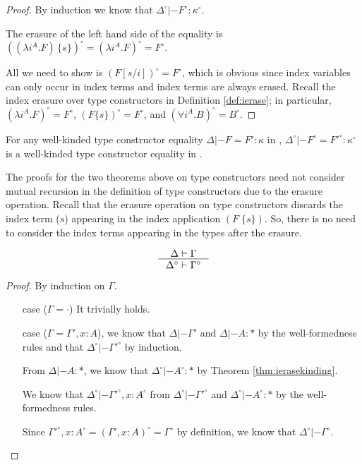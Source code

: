 \begin{proof}
By induction we know that $\Delta^\circ |- F^\circ : \kappa^\circ$.

The erasure of the left hand side of the equality is\\
$((\lambda i^A.F)\,\{s\})^\circ = (\lambda i^A.F)^\circ = F^\circ$.

All we need to show is $(F[s/i])^\circ = F^\circ$, which is obvious
since index variables can only occur in index terms and index terms
are always erased. Recall the index erasure over type constructors in
Definition \ref{def:ierase}; in particular, $(\lambda i^A.F)^\circ=F^\circ$,
$(F\{s\})^\circ=F^\circ$, and $(\forall i^A.B)^\circ=B^\circ$.
\end{proof}
\begin{remark}
For any well-kinded type constructor equality $\Delta |- F=F':\kappa$ in \Fi,
$\Delta^\circ|- F^\circ=F'^\circ:\kappa^\circ$ is
a well-kinded type constructor equality in \Fw.
\end{remark}

The proofs for the two theorems above on type constructors need not consider
mutual recursion in the definition of type constructors due to
the erasure operation. Recall that the erasure operation on type constructors
discards the index term ($s$) appearing in the index application $(F\;\{s\})$.
So, there is no need to consider the index terms appearing in the types after
the erasure.

\begin{theorem}
\label{thm:ierasetmctx}
\[ \inference{\Delta |- \Gamma}{\Delta^\circ |- \Gamma^\circ} \]
\end{theorem}
\begin{proof}
By induction on $\Gamma$.
\begin{itemize}
\item[case] ($\Gamma=\cdot$) It trivially holds.
\item[case] ($\Gamma = \Gamma',x:A$),
we know that  $\Delta |- \Gamma'$ and $\Delta |- A:*$
by the well-formedness rules
and that $\Delta^\circ |- \Gamma'^\circ$ by induction.

From $\Delta |- A:*$, we know that $\Delta^\circ |- A^\circ :*$
by Theorem \ref{thm:ierasekinding}.

We know that $\Delta^\circ |- \Gamma'^\circ,x:A^\circ$
from $\Delta^\circ |- \Gamma'^\circ$ and $\Delta^\circ |- A^\circ :*$
by the well-formedness rules.

Since $\Gamma'^\circ,x:A^\circ = (\Gamma',x:A)^\circ = \Gamma^\circ$
by definition, we know that $\Delta^\circ |- \Gamma^\circ$.
\end{itemize}\vspace*{-10pt}
\end{proof}

